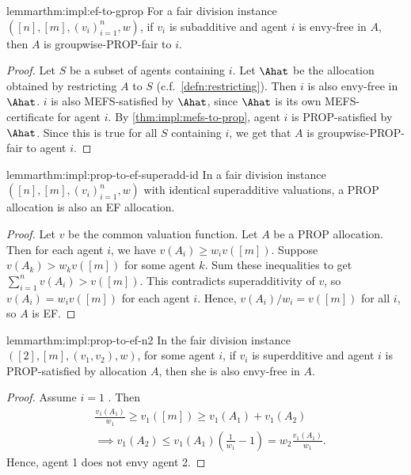 \begin{restatable}{lemma}{rthm:impl:ef-to-gprop}
\label{thm:impl:ef-to-gprop}
For a fair division instance $([n], [m], (v_i)_{i=1}^n, w)$,
if $v_i$ is subadditive and agent $i$ is envy-free in $A$,
then $A$ is groupwise-PROP-fair to $i$.
\end{restatable}
\begin{proof}
Let $S$ be a subset of agents containing $i$.
Let $\Ahat$ be the allocation obtained by restricting $A$ to $S$ (c.f.~\cref{defn:restricting}).
Then $i$ is also envy-free in $\Ahat$.
$i$ is also MEFS-satisfied by $\Ahat$, since $\Ahat$ is its own MEFS-certificate for agent $i$.
By \cref{thm:impl:mefs-to-prop}, agent $i$ is PROP-satisfied by $\Ahat$.
Since this is true for all $S$ containing $i$,
we get that $A$ is groupwise-PROP-fair to agent $i$.
\end{proof}

\begin{restatable}{lemma}{rthm:impl:prop-to-ef-superadd-id}
\label{thm:impl:prop-to-ef-superadd-id}
In a fair division instance $([n], [m], (v_i)_{i=1}^n, w)$ with identical superadditive valuations,
a PROP allocation is also an EF allocation.
\end{restatable}
\begin{proof}
Let $v$ be the common valuation function. Let $A$ be a PROP allocation.
Then for each agent $i$, we have $v(A_i) \ge w_iv([m])$.
Suppose $v(A_k) > w_kv([m])$ for some agent $k$.
Sum these inequalities to get $\sum_{i=1}^n v(A_i) > v([m])$.
This contradicts superadditivity of $v$, so $v(A_i) = w_iv([m])$ for each agent $i$.
Hence, $v(A_i)/w_i = v([m])$ for all $i$, so $A$ is EF.
\end{proof}

\begin{restatable}[PROP $\fimplies$ EF for $n=2$]{lemma}{rthm:impl:prop-to-ef-n2}
\label{thm:impl:prop-to-ef-n2}
In the fair division instance $([2], [m], (v_1, v_2), w)$, for some agent $i$,
if $v_i$ is superdditive and agent $i$ is PROP-satisfied by allocation $A$,
then she is also envy-free in $A$.
\end{restatable}
\begin{proof}
Assume $i=1$ \wLoG. Then
\begin{align*}
& \frac{v_1(A_1)}{w_1} \ge v_1([m]) \ge v_1(A_1) + v_1(A_2)
\\ &\implies v_1(A_2) \le v_1(A_1)\left(\frac{1}{w_1} - 1\right) = w_2 \frac{v_1(A_1)}{w_1}.
\end{align*}
Hence, agent 1 does not envy agent 2.
\end{proof}


